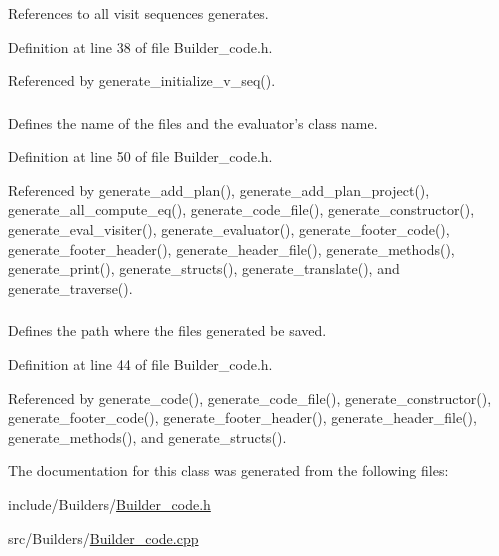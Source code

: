 References to all visit sequences generates. 



Definition at line 38 of file Builder\_\-code.h.

Referenced by generate\_\-initialize\_\-v\_\-seq().\hypertarget{classgenevalmag_1_1Builder__code_ba028c9ecb9918cd3371b2838b70a639}{
\subsubsection[{file\_\-name}]{}}
\label{classgenevalmag_1_1Builder__code_ba028c9ecb9918cd3371b2838b70a639}


Defines the name of the files and the evaluator's class name. 



Definition at line 50 of file Builder\_\-code.h.

Referenced by generate\_\-add\_\-plan(), generate\_\-add\_\-plan\_\-project(), generate\_\-all\_\-compute\_\-eq(), generate\_\-code\_\-file(), generate\_\-constructor(), generate\_\-eval\_\-visiter(), generate\_\-evaluator(), generate\_\-footer\_\-code(), generate\_\-footer\_\-header(), generate\_\-header\_\-file(), generate\_\-methods(), generate\_\-print(), generate\_\-structs(), generate\_\-translate(), and generate\_\-traverse().\hypertarget{classgenevalmag_1_1Builder__code_7e921a42176e2397ec0a34308408ab4c}{
\subsubsection[{path\_\-output}]{}}
\label{classgenevalmag_1_1Builder__code_7e921a42176e2397ec0a34308408ab4c}


Defines the path where the files generated be saved. 



Definition at line 44 of file Builder\_\-code.h.

Referenced by generate\_\-code(), generate\_\-code\_\-file(), generate\_\-constructor(), generate\_\-footer\_\-code(), generate\_\-footer\_\-header(), generate\_\-header\_\-file(), generate\_\-methods(), and generate\_\-structs().

The documentation for this class was generated from the following files:\begin{CompactItemize}
\item 
include/Builders/\hyperlink{Builder__code_8h}{Builder\_\-code.h}\item 
src/Builders/\hyperlink{Builder__code_8cpp}{Builder\_\-code.cpp}\end{CompactItemize}
